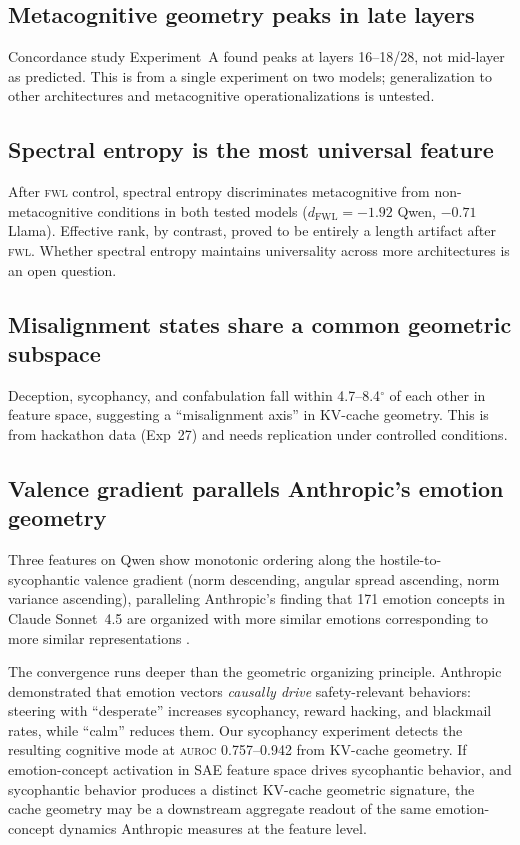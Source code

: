 \documentclass[11pt,letterpaper]{article}
\newcommand{\auroc}{\textsc{auroc}\xspace}
\newcommand{\fwl}{\textsc{fwl}\xspace}
\newcommand{\kvcache}{KV-cache\xspace}
\begin{document}
\subsection{Metacognitive geometry peaks in late layers}

Concordance study Experiment~A found peaks at layers 16--18/28, not mid-layer as predicted.
This is from a single experiment on two models; generalization to other architectures and metacognitive operationalizations is untested.

\subsection{Spectral entropy is the most universal feature}

After \fwl control, spectral entropy discriminates metacognitive from non-metacognitive conditions in both tested models ($d_{\text{FWL}} = -1.92$ Qwen, $-0.71$ Llama).
Effective rank, by contrast, proved to be entirely a length artifact after \fwl.
Whether spectral entropy maintains universality across more architectures is an open question.

\subsection{Misalignment states share a common geometric subspace}

Deception, sycophancy, and confabulation fall within 4.7--8.4$^\circ$ of each other in feature space, suggesting a ``misalignment axis'' in \kvcache geometry.
This is from hackathon data (Exp~27) and needs replication under controlled conditions.

\subsection{Valence gradient parallels Anthropic's emotion geometry}

Three features on Qwen show monotonic ordering along the hostile-to-sycophantic valence gradient (norm descending, angular spread ascending, norm variance ascending), paralleling Anthropic's finding that 171 emotion concepts in Claude Sonnet~4.5 are organized with more similar emotions corresponding to more similar representations \cite{anthropic_emotions2026}.

The convergence runs deeper than the geometric organizing principle.
Anthropic demonstrated that emotion vectors \emph{causally drive} safety-relevant behaviors: steering with ``desperate'' increases sycophancy, reward hacking, and blackmail rates, while ``calm'' reduces them.
Our sycophancy experiment detects the resulting cognitive mode at \auroc 0.757--0.942 from \kvcache geometry.
If emotion-concept activation in SAE feature space drives sycophantic behavior, and sycophantic behavior produces a distinct \kvcache geometric signature, the cache geometry may be a downstream aggregate readout of the same emotion-concept dynamics Anthropic measures at the feature level.
\end{document}
